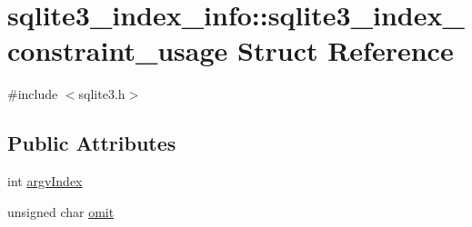 \hypertarget{structsqlite3__index__info_1_1sqlite3__index__constraint__usage}{\section{sqlite3\-\_\-index\-\_\-info\-:\-:sqlite3\-\_\-index\-\_\-constraint\-\_\-usage Struct Reference}
\label{structsqlite3__index__info_1_1sqlite3__index__constraint__usage}
}


{\ttfamily \#include $<$sqlite3.\-h$>$}

\subsection*{Public Attributes}
\begin{DoxyCompactItemize}
\item 
int \hyperlink{structsqlite3__index__info_1_1sqlite3__index__constraint__usage_a2cbf680033c2937b3de226e091743a94}{argv\-Index}
\item 
unsigned char \hyperlink{structsqlite3__index__info_1_1sqlite3__index__constraint__usage_ad07fa17d30e4fb3abe23ceaf84edf0ef}{omit}
\end{DoxyCompactItemize}


